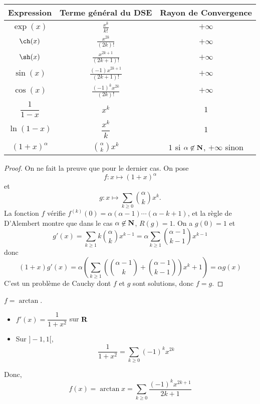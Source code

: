 \begin{thm}
    \begin{center}
        \begin{tabular}{ccc}
            \hline \hline Expression & Terme général du DSE & Rayon de Convergence \\
            \hline
            \rule{0pt}{2em} $\exp(x)$ & $\displaystyle \frac{x^k}{k!}$ & $+\infty$ \\
            \rule{0pt}{2em} $\ch(x)$ & $\displaystyle \frac{x^{2k}}{(2k)!}$ & $+\infty$ \\
            \rule{0pt}{2em} $\sh(x)$ & $\displaystyle \frac{x^{2k+1}}{(2k+1)!}$ & $+\infty$ \\
            \rule{0pt}{2em} $\sin(x)$ & $\displaystyle \frac{(-1)x^{2k+1}}{(2k+1)!}$ & $+\infty$ \\
            \rule{0pt}{2em} $\cos(x)$ & $\displaystyle \frac{(-1)^kx^{2k}}{(2k)!}$ & $+\infty$ \\
            \rule{0pt}{2em} $\dfrac1{1-x}$ & $x^k$ & $1$ \\
            \rule{0pt}{2em} $\ln(1-x)$ & $\dfrac{x^k}k$ & $1$ \\
            \rule{0pt}{2em} $(1+x)^\alpha$ & $\displaystyle \binom \alpha kx^k$ & $1$ si $\alpha\not\in\mathbf N$, $+\infty$ sinon \\[1em]
            \hline
        \end{tabular}
    \end{center}
\end{thm}

\begin{proof}
    On ne fait la preuve que pour le dernier cas. On pose \[
        f:x\longmapsto(1+x)^\alpha
    \]
    et \[
        g:x\longmapsto \sum_{k\geq 0}\binom \alpha kx^k.
    \] La fonction $f$ vérifie $f^{(k)}(0)=\alpha(\alpha-1)\cdots (\alpha-k+1)$, et la règle de D'Alembert  montre que dans le cas $\alpha \not \in \mathbf N$, $R(g)=1$. On a $g(0)=1$ et \[
    g'(x)=\sum_{k\geq 1}k\binom \alpha kx^{k-1}=\alpha\sum_{k\geq 1}\binom {\alpha-1}{k-1}x^{k-1}
\]
donc \[
    (1+x)g'(x)=\alpha \left( \sum_{k\geq 1} \left( \binom {\alpha-1}k+\binom{\alpha-1}{k-1} \right)x^k+1 \right)=\alpha g(x)
\]
C'est un problème de Cauchy dont $f$ et $g$ sont solutions, donc $f=g$.
\end{proof}

\begin{ex}
    $f=\arctan$. \begin{itemize}
        \item $f'(x)=\dfrac1{1+x^2}$ sur $\mathbf R$
        \item Sur $]-1, 1[$, \[
                \frac1{1+x^2}=\sum_{k\geq 0}(-1)^kx^{2k}
            \]
    \end{itemize}
    Donc, \[
        f(x)=\arctan x=\sum_{k\geq 0}\frac{(-1)^kx^{2k+1}}{2k+1}
    \]
\end{ex}

